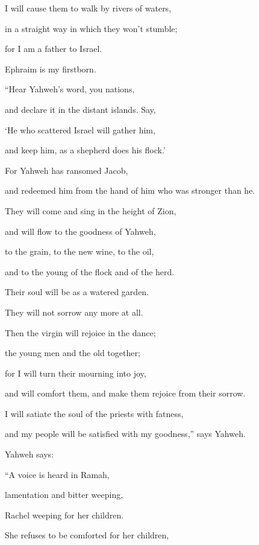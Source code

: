 {\par }{\Q I will cause them to walk by rivers of waters,
\par }{\QB in a straight way in which they won’t stumble;
\par }{\Q for I am a father to Israel.
\par }{\QB Ephraim is my firstborn.
\par }{\BB \par }{\Q {}“Hear Yahweh’s word, you nations,
\par }{\QB and declare it in the distant islands. Say,
\par }{\Q ‘He who scattered Israel will gather him,
\par }{\QB and keep him, as a shepherd does his flock.’
\par }{\Q {}For Yahweh has ransomed Jacob,
\par }{\QB and redeemed him from the hand of him who was stronger than he.
\par }{\Q {}They will come and sing in the height of Zion,
\par }{\QB and will flow to the goodness of Yahweh,
\par }{\Q to the grain, to the new wine, to the oil,
\par }{\QB and to the young of the flock and of the herd.
\par }{\Q Their soul will be as a watered garden.
\par }{\QB They will not sorrow any more at all.
\par }{\Q {}Then the virgin will rejoice in the dance;
\par }{\QB the young men and the old together;
\par }{\Q for I will turn their mourning into joy,
\par }{\QB and will comfort them, and make them rejoice from their sorrow.
\par }{\Q {}I will satiate the soul of the priests with fatness,
\par }{\QB and my people will be satisfied with my goodness,” says Yahweh.
\par }{\BB \par }{\PP {}Yahweh says:
\par }{\Q “A voice is heard in Ramah,
\par }{\QB lamentation and bitter weeping,
\par }{\Q Rachel weeping for her children.
\par }{\QB She refuses to be comforted for her children,
}
